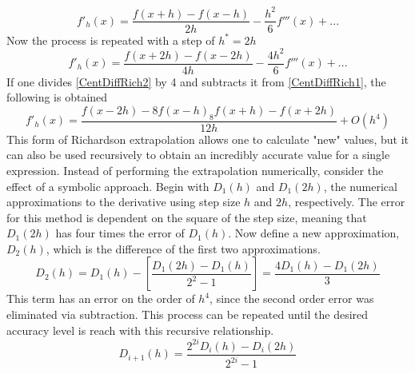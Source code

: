 \documentclass[12pt]{article}
\begin{document}
\begin{equation}
\label{CentDiffRich1}
f'_h(x)=\frac{f(x+h)-f(x-h)}{2h}-\frac{h^2}{6}f'''(x)+...
\end{equation}
Now the process is repeated with a step of $h^* = 2h$
\begin{equation}
\label{CentDiffRich2}
f'_h(x)=\frac{f(x+2h)-f(x-2h)}{4h}-\frac{4h^2}{6}f'''(x)+...
\end{equation}
If one divides \eqref{CentDiffRich2} by 4 and subtracts it from \eqref{CentDiffRich1}, the following is obtained
\begin{equation}
\label{CentDiffRich}
f'_h(x)=\frac{f(x-2h)-8f(x-h)_8f(x+h)-f(x+2h)}{12h} + O(h^4)
\end{equation}
This form of Richardson extrapolation allows one to calculate "new" values, but it can also be used recursively to obtain an incredibly accurate value for a single expression.  Instead of performing the extrapolation numerically, consider the effect of a symbolic approach.  Begin with $D_1(h)$ and $D_1(2h)$, the numerical approximations to the derivative using step size $h$ and $2h$, respectively.  The error for this method is dependent on the square of the step size, meaning that $D_1(2h)$ has four times the error of $D_1(h)$.  Now define a new approximation, $D_2(h)$, which is the difference of the first two approximations.  
\begin{equation}
\label{CentDiffRich}
D_2(h)=D_1(h)-[\frac{D_1(2h)-D_1(h)}{2^2-1}] = \frac{4D_1(h)-D_1(2h)}{3}
\end{equation}
This term has an error on the order of $h^4$, since the second order error was eliminated via subtraction.  This process can be repeated until the desired accuracy level is reach with this recursive relationship.
\begin{equation}
\label{CentDiffRich}
D_{i+1}(h)=\frac{2^{2i}D_i(h)-D_i(2h)}{2^{2i}-1}
\end{equation}
\end{document}
